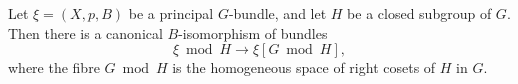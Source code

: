 Let $\xi = (X, p, B)$ be a principal $G$-bundle, and let $H$ be a closed subgroup of $G$. Then there is a canonical $B$-isomorphism of bundles
$$
\xi \bmod H \rightarrow \xi[G \bmod H],
$$
where the fibre $G \bmod H$ is the homogeneous space of right cosets of $H$ in $G$.
